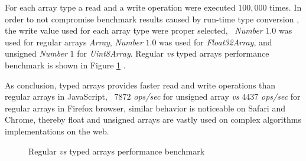 For each array type a read and a write operation were executed $100,000$ times. In order to not compromise benchmark results caused by run-time type conversion \cite{International2009}, the write value used for each array type were proper selected, \eg\ \textit{Number} $1.0$ was used for regular arrays \textit{Array}, \textit{Number} $1.0$ was used for \textit{Float32Array}, and unsigned \textit{Number} $1$ for \textit{Uint8Array}. Regular \textit{vs} typed arrays performance benchmark is shown in Figure \ref{figure:typed_arrays_performance} \cite{TypedArrayPerformance2013}.

As conclusion, typed arrays provides faster read and write operations than regular arrays in JavaScript, \ie\ $7872$ \textit{ops/sec} for unsigned array \textit{vs} $4437$ \textit{ops/sec} for regular arrays in Firefox browser, similar behavior is noticeable on Safari and Chrome, thereby float and unsigned arrays are vastly used on complex algorithms implementations on the web.

\begin{figure}[!htb]
  \caption{Regular \textit{vs} typed arrays performance benchmark}
  \label{figure:typed_arrays_performance}
\end{figure}


